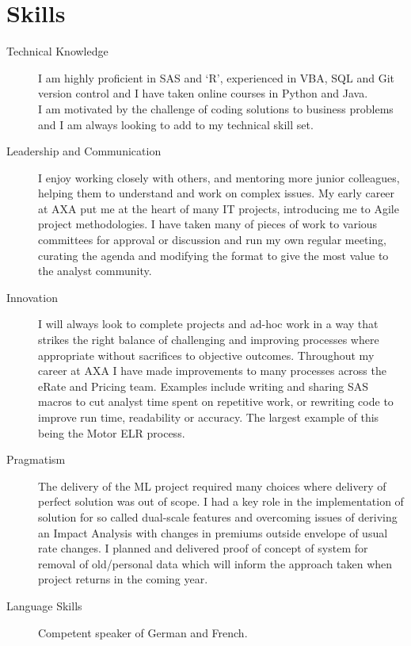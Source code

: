 \documentclass[11pt]{article}
\begin{document}
\section*{Skills}
\begin{description}

\item[Technical Knowledge] I am highly proficient in SAS and `R', experienced in VBA, SQL and Git version control and I have taken online courses in Python and Java. \\
I am motivated by the challenge of coding solutions to business problems and I am always looking to add to my technical skill set.

\item[Leadership and Communication] I enjoy working closely with others, and mentoring more junior colleagues, helping them to understand and work on complex issues. My early career at AXA put me at the heart of many IT projects, introducing me to Agile project methodologies. I have taken many of pieces of work to various committees for approval or discussion and run my own regular meeting, curating the agenda and modifying the format to give the most value to the analyst community.

\item[Innovation] I will always look to complete projects and ad-hoc work in a way that strikes the right balance of challenging and improving processes where appropriate without sacrifices to objective outcomes. Throughout my career at AXA I have made improvements to many processes across the eRate and Pricing team. Examples include  writing and sharing SAS macros to cut analyst time spent on repetitive work, or rewriting code to improve run time, readability or accuracy. The largest example of this being the Motor ELR process.

\item[Pragmatism] The delivery of the ML project required many choices where delivery of perfect solution was out of scope. I had a key role in the implementation of solution for so called dual-scale features and overcoming issues of deriving an Impact Analysis with changes in premiums outside envelope of usual rate changes. I planned and delivered proof of concept of system for removal of old/personal data which will inform the approach taken when project returns in the coming year.

\item[Language Skills] Competent speaker of German and French.

\end{description} 
\end{document}
